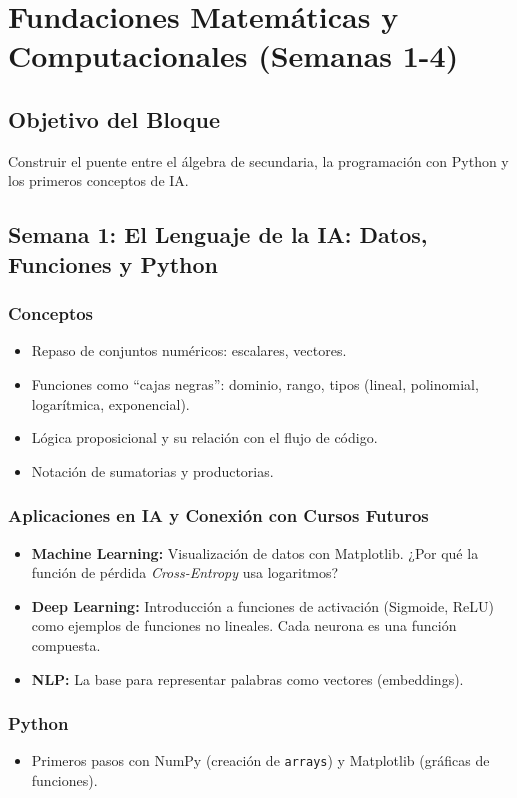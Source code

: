 \documentclass[12pt,a4paper,openany,oneside]{book}
\begin{document}
\chapter{Fundaciones Matemáticas y Computacionales (Semanas 1-4)}
\section*{Objetivo del Bloque}
Construir el puente entre el álgebra de secundaria, la programación con Python y los primeros conceptos de IA.

\section{Semana 1: El Lenguaje de la IA: Datos, Funciones y Python}

\subsection{Conceptos}
\begin{itemize}
    \item Repaso de conjuntos numéricos: escalares, vectores.
    \item Funciones como ``cajas negras'': dominio, rango, tipos (lineal, polinomial, logarítmica, exponencial).
    \item Lógica proposicional y su relación con el flujo de código.
    \item Notación de sumatorias y productorias.
\end{itemize}

\subsection{Aplicaciones en IA y Conexión con Cursos Futuros}
\begin{itemize}
    \item \textbf{Machine Learning:} Visualización de datos con Matplotlib. ¿Por qué la función de pérdida \textit{Cross-Entropy} usa logaritmos?
    \item \textbf{Deep Learning:} Introducción a funciones de activación (Sigmoide, ReLU) como ejemplos de funciones no lineales. Cada neurona es una función compuesta.
    \item \textbf{NLP:} La base para representar palabras como vectores (embeddings).
\end{itemize}

\subsection{Python}
\begin{itemize}
    \item Primeros pasos con NumPy (creación de \texttt{arrays}) y Matplotlib (gráficas de funciones).
\end{itemize}
\end{document}
